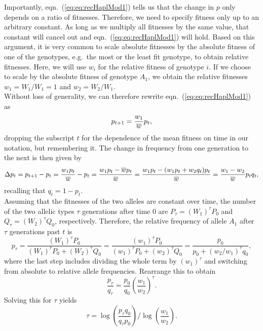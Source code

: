 Importantly, eqn.\ (\ref{eq:eq:recHaplMod1}) tells us that the change in $p$ only depends on a ratio of fitnesses. Therefore, we need to specify fitness only up to an arbitrary constant. As long as we multiply all fitnesses by the same value, that constant will cancel out and eqn.\ (\ref{eq:eq:recHaplMod1}) will hold. Based on this argument, it is very common to scale absolute fitnesses by the absolute fitness of one of the genotypes, e.g.\ the most or the least fit genotype, to obtain relative fitnesses. Here, we will use $w_i$ for the relative fitness of genotype $i$. If we choose to scale by the absolute fitness of genotype $A_1$, we obtain the relative fitnesses $w_1 = W_1/W_1 = 1$ and $w_2 = W_2/W_1$.\\
Without loss of generality, we can therefore rewrite eqn.\ (\ref{eq:eq:recHaplMod1}) as
\begin{equation}
	\label{eq:recHaplMod2}
	p_{t+1} = \frac{w_1}{\overline{w}} p_t,
\end{equation}
dropping the subscript $t$ for the dependence of the mean fitness on time in our notation, but remembering it.
The change in frequency from one generation to the next is then given by
\begin{equation}
\Delta p_t = p_{t+1} - p_t= \frac{ w_1 p_t}{ \overline{w}} - p_t = \frac{w_1 p_t - \overline{w} p_t}{\overline{w}} = \frac{w_1 p_t - (w_1 p_t + w_2 q_t) p_t}{\overline{w}} = \frac{w_1 - w_2}{\overline{w}} p_t q_t,
\label{eq:deltap_haploid}
\end{equation}
recalling that $q_t = 1 - p_t$.\\

Assuming that the fitnesses of the two alleles are constant over time,
the number of the two allelic types $\tau$ generations after time $0$ are
$P_{\tau} = (W_1)^{\tau} P_0$ and $Q_{\tau}=  (W_2)^{\tau} Q_0$, respectively. Therefore, the relative frequency of allele $A_1$ after $\tau$ generations past $t$ is
\begin{equation}
	p_{\tau} = \frac{ (W_1)^{\tau} P_0}{ (W_1)^{\tau} P_0+(W_2)^{\tau} Q_0} = \frac{ (w_1)^{\tau} P_0}{ (w_1)^{\tau} P_0+(w_2)^{\tau} Q_0} = \frac{p_0}{p_0 + (w_2/w_1)^{\tau} q_0},
	\label{eq:haploid_tau_gen}
\end{equation}
where the last step includes dividing the whole term by $(w_1)^{\tau}$ and switching from absolute to relative allele frequencies.
Rearrange this to obtain
\begin{equation}
	\label{eq:estTau}
	\frac{p_{\tau}}{q_{\tau}} = \frac{p_0}{q_0} \left(\frac{w_1}{w_2}\right)^{\tau}.
\end{equation}
Solving this for $\tau$ yields
\begin{equation}
	\label{eq:solTau}
	\tau = \log \left(\frac{p_{\tau} q_0}{q_{\tau} p_0}\right) /  \log\left(  \frac{w_1}{w_2} \right).
\end{equation}
\\

